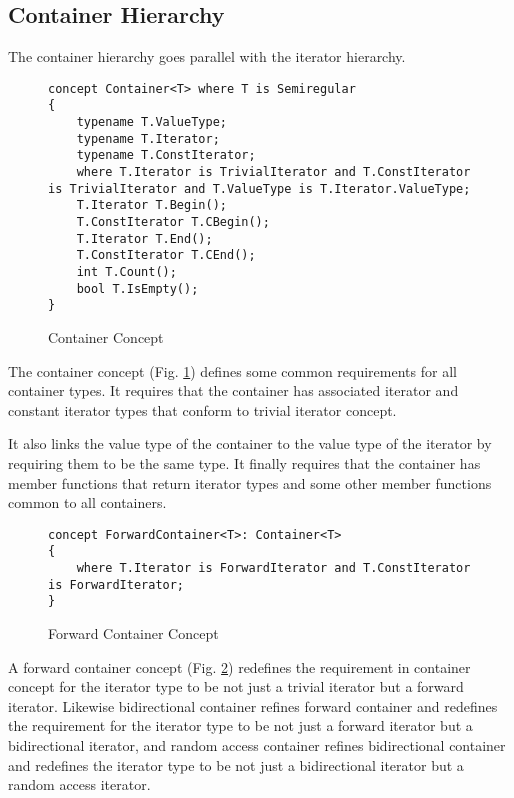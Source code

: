 \documentclass[oneside, a4paper, 11pt]{article}
\begin{document}
\subsection{Container Hierarchy}

The container hierarchy goes parallel with the iterator hierarchy.

\begin{figure}[htb]\caption{Container Concept}\label{fig:containerconcepts}
\begin{lstlisting}[frame=trBL]
concept Container<T> where T is Semiregular
{
    typename T.ValueType;
    typename T.Iterator;
    typename T.ConstIterator;
    where T.Iterator is TrivialIterator and T.ConstIterator is TrivialIterator and T.ValueType is T.Iterator.ValueType;
    T.Iterator T.Begin();
    T.ConstIterator T.CBegin();
    T.Iterator T.End();
    T.ConstIterator T.CEnd();
    int T.Count();
    bool T.IsEmpty();
}
\end{lstlisting}
\end{figure}

The container concept (Fig. \ref{fig:containerconcepts}) defines some common requirements
for all container types.
It requires that the container has associated iterator and constant iterator types
that conform to trivial iterator concept.

It also links the value type of the container to the value type of the iterator by
requiring them to be the same type.
It finally requires that the container has member functions that return
iterator types and some other member functions common to all containers.

\begin{figure}[htb]\caption{Forward Container Concept}\label{fig:fwdcontainer}
\begin{lstlisting}[frame=trBL]
concept ForwardContainer<T>: Container<T>
{
    where T.Iterator is ForwardIterator and T.ConstIterator is ForwardIterator;
}
\end{lstlisting}
\end{figure}

A forward container concept (Fig. \ref{fig:fwdcontainer})
redefines the requirement in container concept for the iterator type to be not just
a trivial iterator but a forward iterator.
Likewise bidirectional container refines forward container and redefines the requirement
for the iterator type to be not just a forward iterator but a bidirectional iterator,
and random access container refines bidirectional container and redefines the iterator
type to be not just a bidirectional iterator but a random access iterator.
\end{document}

